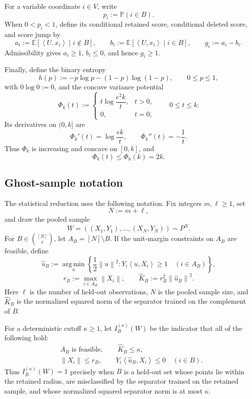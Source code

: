 \documentclass[11pt]{article}
\theoremstyle{definition}
\theoremstyle{remark}
\newcommand{\E}{\mathbb E}
\newcommand{\Pp}{\mathbb P}
\newcommand{\ip}[2]{\left\langle #1,#2\right\rangle}
\newcommand{\norm}[1]{\left\lVert #1\right\rVert}
\newcommand{\argminop}{\operatorname*{arg\,min}}
\begin{document}
For a variable coordinate \(i\in V\), write
\[
 p_i:=\Pp(i\in B).
\]
When \(0<p_i<1\), define its conditional retained score, conditional deleted
score, and score jump by
\[
 a_i:=\E[\ip{U}{x_i}\mid i\notin B],
 \qquad
 b_i:=\E[\ip{U}{x_i}\mid i\in B],
 \qquad
 g_i:=a_i-b_i.
 \tag{2.7}
\]
Admissibility gives \(a_i\ge1\), \(b_i\le0\), and hence \(g_i\ge1\).

Finally, define the binary entropy
\[
 h(p):=-p\log p-(1-p)\log(1-p),
 \qquad 0\le p\le1,
 \tag{2.8}
\]
with \(0\log0:=0\), and the concave variance potential
\[
 \Phi_k(t)
 :=
 \begin{cases}
 t\log\dfrac{e^2k}{t},&t>0,\\[2mm]
 0,&t=0,
 \end{cases}
 \qquad 0\le t\le k.
 \tag{2.9}
\]
Its derivatives on \((0,k]\) are
\[
 \Phi_k'(t)=\log\frac{ek}{t},
 \qquad
 \Phi_k''(t)=-\frac1t.
 \tag{2.10}
\]
Thus \(\Phi_k\) is increasing and concave on \([0,k]\), and
\[
 \Phi_k(t)\le\Phi_k(k)=2k.
 \tag{2.11}
\]

\subsection{Ghost-sample notation}

The statistical reduction uses the following notation. Fix integers
\(m,\ell\ge1\), set
\[
 N:=m+\ell,
\]
and draw the pooled sample
\[
 W=((X_1,Y_1),\ldots,(X_N,Y_N))\sim P^N.
\]
For \(B\in\binom{[N]}\ell\), let \(A_B=[N]\setminus B\). If the unit-margin
constraints on \(A_B\) are feasible, define
\[
 \widehat u_B
 :=
 \argminop_u
 \left\{
   \frac12\norm u^2:
   Y_i\ip{u}{X_i}\ge1\quad(i\in A_B)
 \right\},
\]
\[
 r_B:=\max_{i\in A_B}\norm{X_i},
 \qquad
 \widehat K_B:=r_B^2\norm{\widehat u_B}^2.
\]
Here \(\ell\) is the number of held-out observations, \(N\) is the pooled
sample size, and \(\widehat K_B\) is the normalized squared norm of the
separator trained on the complement of \(B\).

For a deterministic cutoff \(\kappa\ge1\), let
\(I_B^{(\kappa)}(W)\) be the indicator that all of the following hold:
\[
 \begin{split}
 &A_B\text{ is feasible},
 \qquad
 \widehat K_B\le\kappa,\\
 &\norm{X_i}\le r_B,
 \qquad
 Y_i\ip{\widehat u_B}{X_i}\le0
 \quad(i\in B).
 \end{split}
 \tag{2.12}\label{eq:ghost-indicator}
\]
Thus \(I_B^{(\kappa)}(W)=1\) precisely when \(B\) is a held-out set whose
points lie within the retained radius, are misclassified by the separator
trained on the retained sample, and whose normalized squared separator norm
is at most \(\kappa\).
\end{document}
